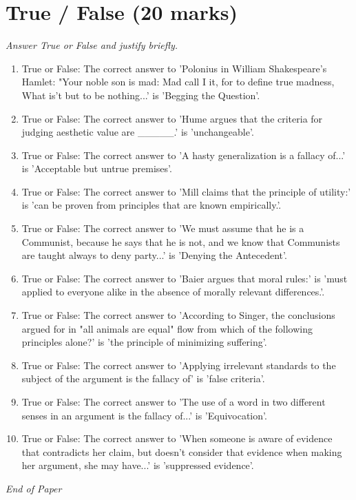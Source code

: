 \documentclass[12pt]{article}
\begin{document}
\section*{True / False (20 marks)}
\textit{Answer True or False and justify briefly.}
\begin{enumerate}[label=\arabic*.]
\item True or False: The correct answer to 'Polonius in William Shakespeare's Hamlet: "Your noble son is mad: Mad call I it, for to define true madness, What is't but to be nothing...' is 'Begging the Question'.
\item True or False: The correct answer to 'Hume argues that the criteria for judging aesthetic value are \_\_\_\_\_.' is 'unchangeable'.
\item True or False: The correct answer to 'A hasty generalization is a fallacy of...' is 'Acceptable but untrue premises'.
\item True or False: The correct answer to 'Mill claims that the principle of utility:' is 'can be proven from principles that are known empirically.'.
\item True or False: The correct answer to 'We must assume that he is a Communist, because he says that he is not, and we know that Communists are taught always to deny party...' is 'Denying the Antecedent'.
\item True or False: The correct answer to 'Baier argues that moral rules:' is 'must applied to everyone alike in the absence of morally relevant differences.'.
\item True or False: The correct answer to 'According to Singer, the conclusions argued for in "all animals are equal" flow from which of the following principles alone?' is 'the principle of minimizing suffering'.
\item True or False: The correct answer to 'Applying irrelevant standards to the subject of the argument is the fallacy of' is 'false criteria'.
\item True or False: The correct answer to 'The use of a word in two different senses in an argument is the fallacy of...' is 'Equivocation'.
\item True or False: The correct answer to 'When someone is aware of evidence that contradicts her claim, but doesn't consider that evidence when making her argument, she may have...' is 'suppressed evidence'.
\end{enumerate}

\vfill
\noindent\textit{End of Paper}
\end{document}
